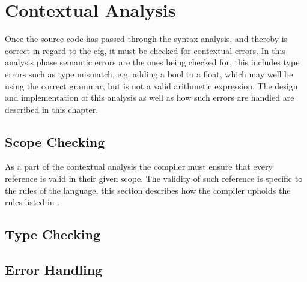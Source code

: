 




\chapter{Contextual Analysis}
Once the source code has passed through the syntax analysis, and thereby is correct in regard to the \acrshort{cfg}, it must be checked for contextual errors.
In this analysis phase semantic errors are the ones being checked for, this includes type errors such as type mismatch, e.g. adding a bool to a float, which may well be using the correct grammar, but is not a valid arithmetic expression.
The design and implementation of this analysis as well as how such errors are handled are described in this chapter.



\section{Scope Checking}
As a part of the contextual analysis the compiler must ensure that every reference is valid in their given scope.
The validity of such reference is specific to the rules of the language, this section describes how the compiler upholds the rules listed in .


\section{Type Checking}


\section{Error Handling}




